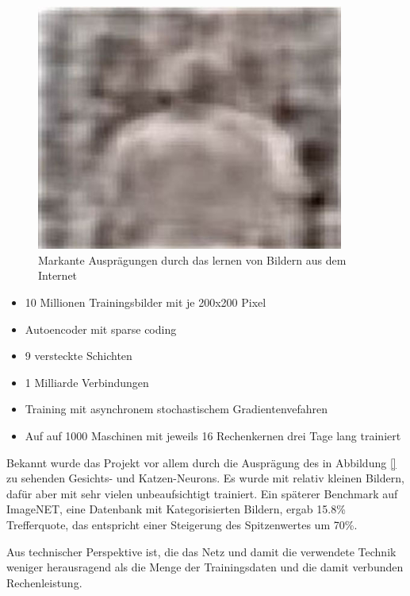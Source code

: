 \begin{figure}
{\begin{minipage}{0.33\textwidth}
	\includegraphics[width=0.9\textwidth]{images/neuron-body.jpg}\end{minipage}}
\label{fig:rbm-steps}
\caption{Markante Ausprägungen durch das lernen von Bildern aus dem Internet}
\label{fig:neurons-google}
\end{figure}

\begin{itemize}
\item 10 Millionen Trainingsbilder mit je 200x200 Pixel
\item Autoencoder mit sparse coding
\item 9 versteckte Schichten
\item 1 Milliarde Verbindungen
\item Training mit asynchronem stochastischem Gradientenvefahren
\item Auf auf 1000 Maschinen mit jeweils 16 Rechenkernen drei Tage lang trainiert
\end{itemize}

Bekannt wurde das Projekt vor allem durch die Ausprägung des in Abbildung \ref{} zu sehenden Gesichts- und Katzen-Neurons.
Es wurde mit relativ kleinen Bildern, dafür aber mit sehr vielen unbeaufsichtigt trainiert. Ein späterer Benchmark auf ImageNET, eine Datenbank mit Kategorisierten Bildern, ergab 15.8\% Trefferquote, das entspricht einer Steigerung des Spitzenwertes um 70\%.

Aus technischer Perspektive ist, die das Netz und damit die verwendete Technik weniger herausragend als die Menge der Trainingsdaten und die damit verbunden Rechenleistung.

